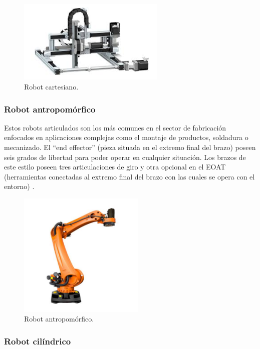 \begin{figure} [h!]
  \begin{center}
    \includegraphics[width=7cm]{figs/robot_cartesiano}
  \end{center}
  \caption{\centering Robot cartesiano.}
  \label{fig:robot_cartesiano}
\end{figure} 

\subsubsection{Robot antropomórfico}

Estos robots articulados son los más comunes en el sector de fabricación enfocados en aplicaciones complejas como el montaje de productos, soldadura o mecanizado. El ``end effector'' (pieza situada en el extremo final del brazo) poseen seis grados de libertad para poder operar en cualquier situación. Los brazos de este estilo poseen tres articulaciones de giro y otra opcional en el EOAT (herramientas conectadas al extremo final del brazo con las cuales se opera con el entorno) \cite{tipos_robots_2}.

\begin{figure} [h!]
  \begin{center}
    \includegraphics[width=6cm]{figs/robot_antropomorfico}
  \end{center}
  \caption{\centering Robot antropomórfico.}
  \label{fig:robot_antropomorfico}
\end{figure} 

\subsubsection{Robot cilíndrico}

